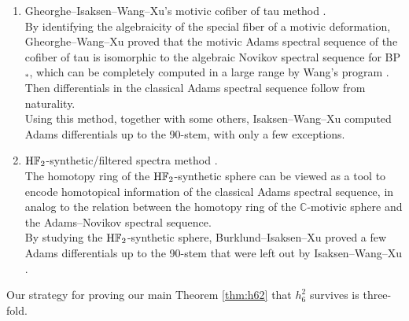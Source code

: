 \documentclass{amsart}
\numberwithin{equation}{section}
\newcommand{\HF}{\mathrm{H}\bF_2}
\begin{document}
\begin{enumerate}
    \noindent There is a nice geometric application of these differentials in stems 60 and 61. The sphere $S^{61}$ has a unique smooth structure and it is the last odd dimensional case: The only ones are $S^1, \ S^3, \ S^5$ and $S^{61}$.\\

    \item Gheorghe--Isaksen--Wang--Xu's motivic cofiber of tau method \cite{GWX, IWX}. \\

    \noindent By identifying the algebraicity of the special fiber of a motivic deformation, Gheorghe--Wang--Xu \cite{GWX} proved that the motivic Adams spectral sequence of the cofiber of tau is isomorphic to the algebraic Novikov spectral sequence for BP$_*$, which can be completely computed in a large range by Wang's program \cite{Wang}. Then differentials in the classical Adams spectral sequence follow from naturality.\\ 
    
    \noindent Using this method, together with some others, Isaksen--Wang--Xu \cite{IWX} computed Adams differentials up to the 90-stem, with only a few exceptions. \\

    \item $\HF$-synthetic/filtered spectra method \cite{Pst, Burklund, BurklundXu, BurklundIsaksenXu}.\\

    \noindent The homotopy ring of the $\HF$-synthetic sphere \cite{Pst, BHS} can be viewed as a tool to encode homotopical information of the classical Adams spectral sequence, in analog to the relation between the homotopy ring of the $\mathbb{C}$-motivic sphere \cite{Isaksen} and the Adams--Novikov spectral sequence. \\

    \noindent By studying the $\HF$-synthetic sphere, Burklund--Isaksen--Xu \cite{BurklundIsaksenXu} proved a few Adams differentials up to the 90-stem that were left out by Isaksen--Wang--Xu \cite{IWX}.\\

    
\end{enumerate}

Our strategy for proving our main Theorem \ref{thm:h62} that $h_6^2$ survives is three-fold. 
\end{document}
